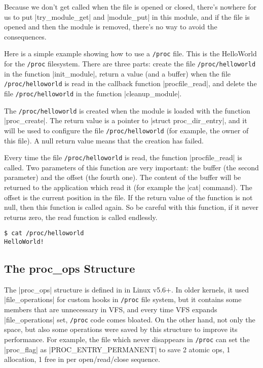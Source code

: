 \documentclass[10pt, oneside]{book}
\begin{document}
Because we don't get called when the file is opened or closed, there's nowhere for us to put \cpp|try_module_get| and \cpp|module_put| in this module, and if the file is opened and then the module is removed, there's no way to avoid the consequences.

Here is a simple example showing how to use a \verb|/proc| file.
This is the HelloWorld for the \verb|/proc| filesystem.
There are three parts: create the file \verb|/proc/helloworld| in the function \cpp|init_module|, return a value (and a buffer) when the file \verb|/proc/helloworld| is read in the callback function \cpp|procfile_read|, and delete the file \verb|/proc/helloworld| in the function \cpp|cleanup_module|.

The \verb|/proc/helloworld| is created when the module is loaded with the function \cpp|proc_create|.
The return value is a pointer to \cpp|struct proc_dir_entry|, and it will be used to configure the file \verb|/proc/helloworld| (for example, the owner of this file).
A null return value means that the creation has failed.

Every time the file \verb|/proc/helloworld| is read, the function \cpp|procfile_read| is called.
Two parameters of this function are very important: the buffer (the second parameter) and the offset (the fourth one).
The content of the buffer will be returned to the application which read it (for example the \sh|cat| command).
The offset is the current position in the file.
If the return value of the function is not null, then this function is called again.
So be careful with this function, if it never returns zero, the read function is called endlessly.

\begin{verbatim}
$ cat /proc/helloworld
HelloWorld!
\end{verbatim}


\subsection{The proc\_ops Structure}
\label{sec:proc_ops}
The \cpp|proc_ops| structure is defined in  in Linux v5.6+.
In older kernels, it used \cpp|file_operations| for custom hooks in \verb|/proc| file system, but it contains some members that are unnecessary in VFS, and every time VFS expands \cpp|file_operations| set, \verb|/proc| code comes bloated.
On the other hand, not only the space, but also some operations were saved by this structure to improve its performance.
For example, the file which never disappears in \verb|/proc| can set the \cpp|proc_flag| as \cpp|PROC_ENTRY_PERMANENT| to save 2 atomic ops, 1 allocation, 1 free in per open/read/close sequence.
\end{document}
